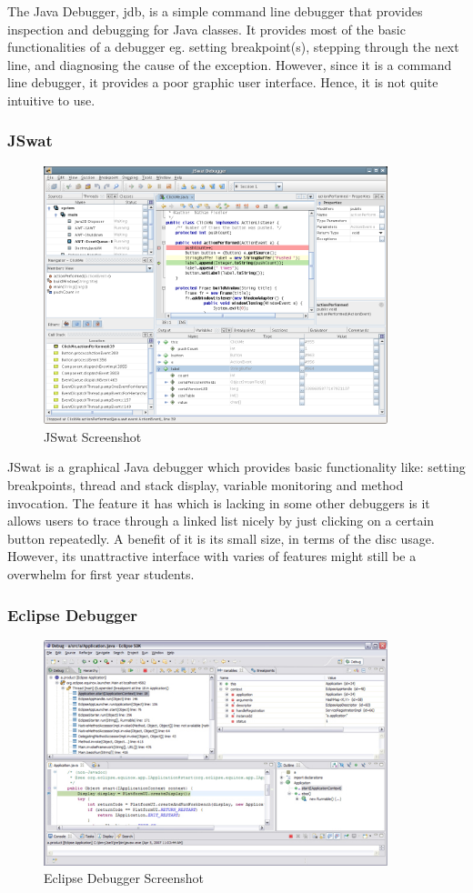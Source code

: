 \documentclass[11pt, a4paper]{article}
\begin{document}
The Java Debugger, jdb, is a simple command line debugger that provides inspection and debugging for Java classes.
It provides most of the basic functionalities of a debugger eg. setting breakpoint(s), stepping through the next line, and diagnosing the cause of the exception.
However, since it is a command line debugger, it provides a poor graphic user interface.
Hence, it is not quite intuitive to use.
\subsubsection{JSwat}
\begin{figure}[h!]
\centering
\includegraphics[width=100mm]{jswat.png}
\caption{JSwat Screenshot}
\end{figure}

JSwat is a graphical Java debugger which provides basic functionality like: setting breakpoints, thread and stack display, variable monitoring and method invocation.
The feature it has which is lacking in some other debuggers is it allows users to trace through a linked list nicely by just clicking on a certain button repeatedly.
A benefit of it is its small size, in terms of the disc usage.
However, its unattractive interface with varies of features might still be a overwhelm for first year students.
\subsubsection{Eclipse Debugger}
\begin{figure}[h!]
\centering
\includegraphics[width=100mm]{eclipse.jpg}
\caption{Eclipse Debugger Screenshot}
\end{figure}
\end{document}
